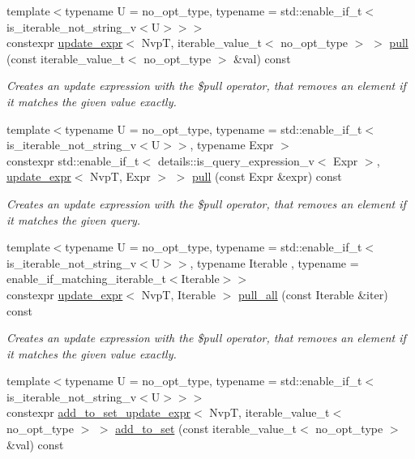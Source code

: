 \begin{DoxyCompactItemize}
{\footnotesize template$<$typename U  = no\+\_\+opt\+\_\+type, typename  = std\+::enable\+\_\+if\+\_\+t$<$is\+\_\+iterable\+\_\+not\+\_\+string\+\_\+v$<$\+U$>$$>$$>$ }\\constexpr \hyperlink{classmangrove_1_1update__expr}{update\+\_\+expr}$<$ NvpT, iterable\+\_\+value\+\_\+t$<$ no\+\_\+opt\+\_\+type $>$ $>$ \hyperlink{classmangrove_1_1nvp__base_ab7924255d0da3477c17a2a247417a44f}{pull} (const iterable\+\_\+value\+\_\+t$<$ no\+\_\+opt\+\_\+type $>$ \&val) const 
\begin{DoxyCompactList}\small\item\em Creates an update expression with the \$pull operator, that removes an element if it matches the given value exactly. \end{DoxyCompactList}\item 
{\footnotesize template$<$typename U  = no\+\_\+opt\+\_\+type, typename  = std\+::enable\+\_\+if\+\_\+t$<$is\+\_\+iterable\+\_\+not\+\_\+string\+\_\+v$<$\+U$>$$>$, typename Expr $>$ }\\constexpr std\+::enable\+\_\+if\+\_\+t$<$ details\+::is\+\_\+query\+\_\+expression\+\_\+v$<$ Expr $>$, \hyperlink{classmangrove_1_1update__expr}{update\+\_\+expr}$<$ NvpT, Expr $>$ $>$ \hyperlink{classmangrove_1_1nvp__base_ad65748212e487bf4d14fbff87ccdf8d4}{pull} (const Expr \&expr) const 
\begin{DoxyCompactList}\small\item\em Creates an update expression with the \$pull operator, that removes an element if it matches the given query. \end{DoxyCompactList}\item 
{\footnotesize template$<$typename U  = no\+\_\+opt\+\_\+type, typename  = std\+::enable\+\_\+if\+\_\+t$<$is\+\_\+iterable\+\_\+not\+\_\+string\+\_\+v$<$\+U$>$$>$, typename Iterable , typename  = enable\+\_\+if\+\_\+matching\+\_\+iterable\+\_\+t$<$\+Iterable$>$$>$ }\\constexpr \hyperlink{classmangrove_1_1update__expr}{update\+\_\+expr}$<$ NvpT, Iterable $>$ \hyperlink{classmangrove_1_1nvp__base_abdaf0c15ead84b8de9e338a622bfdb13}{pull\+\_\+all} (const Iterable \&iter) const 
\begin{DoxyCompactList}\small\item\em Creates an update expression with the \$pull operator, that removes an element if it matches the given value exactly. \end{DoxyCompactList}\item 
{\footnotesize template$<$typename U  = no\+\_\+opt\+\_\+type, typename  = std\+::enable\+\_\+if\+\_\+t$<$is\+\_\+iterable\+\_\+not\+\_\+string\+\_\+v$<$\+U$>$$>$$>$ }\\constexpr \hyperlink{classmangrove_1_1add__to__set__update__expr}{add\+\_\+to\+\_\+set\+\_\+update\+\_\+expr}$<$ NvpT, iterable\+\_\+value\+\_\+t$<$ no\+\_\+opt\+\_\+type $>$ $>$ \hyperlink{classmangrove_1_1nvp__base_aa39e3654e2c9ff1adbe351da4b3374fe}{add\+\_\+to\+\_\+set} (const iterable\+\_\+value\+\_\+t$<$ no\+\_\+opt\+\_\+type $>$ \&val) const 

\end{DoxyCompactItemize}
